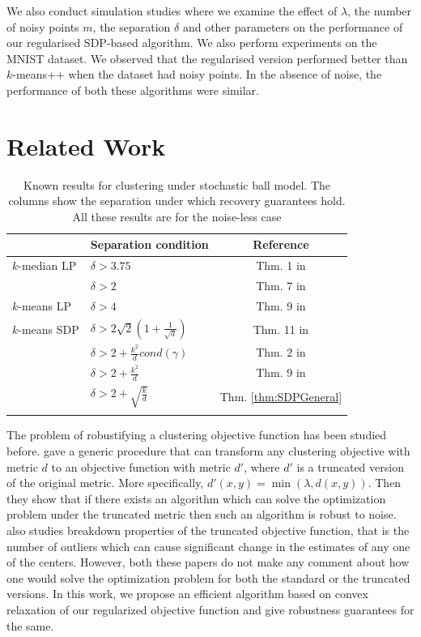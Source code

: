 \documentclass[12pt]{article}
\begin{document}
We also conduct simulation studies where we examine the effect of $\lambda$, the number of noisy points $m$, the separation $\delta$ and other parameters on the performance of our regularised SDP-based algorithm. We also perform experiments on the MNIST dataset. We observed that the regularised version performed better than $k$-means++ when the dataset had noisy points. In the absence of noise, the performance of both these algorithms were similar. 

\section{Related Work}
\begin{table}
\centering
\caption{Known results for clustering under stochastic ball model. The columns show the separation under which recovery guarantees hold. All these results are for the noise-less case}

\label{table:stochasticBall}
\setlength{\tabcolsep}{0.5em} 
{\renewcommand{\arraystretch}{1.2}%
\begin{tabular}{llc}
\\
 & Separation condition & Reference\\
 \hline
$k$-median LP & $\delta > 3.75$ & Thm. 1 in \cite{nellore2015recovery}\\
 & $\delta > 2$ & Thm. 7 in \cite{awasthi2015relax}\\
\hline
$k$-means LP & $\delta > 4$ & Thm. 9 in \cite{nellore2015recovery}\\
\hline
$k$-means SDP & $\delta > 2\sqrt2 (1 + \frac{1}{\sqrt d})$ & Thm. 11 in \cite{awasthi2015relax}\\
 & $\delta > 2 + \frac{k^2}{d}cond(\gamma)$ & Thm. 2 in \cite{iguchi2015tightness}\\
 & $\delta > 2 + \frac{k^2}{d}$ & Thm. 9 in \cite{iguchi2017probably}\\
 & $\delta > 2 + \sqrt{\frac{k}{d}}$ & Thm. \ref {thm:SDPGeneral}\\
\hline


\label{table:alphacenter}
\end{tabular}
}
\end{table}
The problem of robustifying a clustering objective function has been studied before. \cite{ben2014clustering} gave a generic procedure that can transform any clustering objective with metric $d$ to an objective function with metric $d'$, where $d'$ is a truncated version of the original metric. More specifically, $d'(x, y) = \min (\lambda,   d(x,y)).$ Then they show that if there exists an algorithm which can solve the optimization problem under the truncated metric then such an algorithm is robust to noise. \cite{georgogiannis2016robust}  also studies breakdown properties of the truncated objective function, that is the number of outliers which can cause significant change in the estimates of any one of the centers. However, both these papers do not make any comment about how one would solve the optimization problem for both the standard or the truncated versions. In this work, we propose an efficient algorithm based on convex relaxation of our regularized objective function and give robustness guarantees for the same. 
\end{document}
